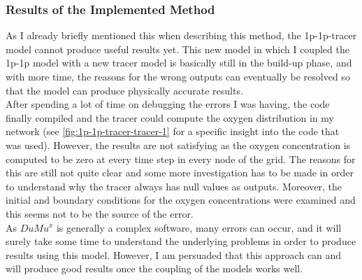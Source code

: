 \subsubsection*{Results of the Implemented Method}
\label{ResultsImplMeth}

As I already briefly mentioned this when describing this method, the 1p-1p-tracer model cannot produce useful results yet. This new model in which I coupled the 1p-1p model with a new tracer model is basically still in the build-up phase, and with more time, the reasons for the wrong outputs can eventually be resolved so that the model can produce physically accurate results.
\\After spending a lot of time on debugging the errors I was having, the code finally compiled and the tracer could compute the oxygen distribution in my network (see \ref{fig:1p-1p-tracer-tracer-1} for a specific insight into the code that was used). However, the results are not satisfying as the oxygen concentration is computed to be zero at every time step in every node of the grid. The reasons for this are still not quite clear and some more investigation has to be made in order to understand why the tracer always has null values as outputs. Moreover, the initial and boundary conditions for the oxygen concentrations were examined and this seems not to be the source of the error.
\\As $DuMu^x$ is generally a complex software, many errors can occur, and it will surely take some time to understand the underlying problems in order to produce results using this model. However, I am persuaded that this approach can and will produce good results once the coupling of the models works well.

\newpage
